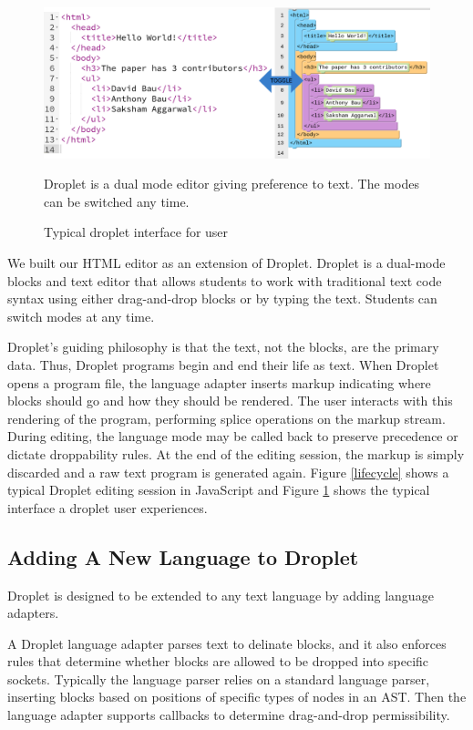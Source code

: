 \documentclass[conference]{IEEEtran}
\begin{document}
\begin{figure}
\centering
\includegraphics[width=6in]{dualmode.png}
\caption{Typical droplet interface for user}
\small
\begin{flushleft}
Droplet is a dual mode editor giving preference to text. The modes can be switched any time.
\end{flushleft}
\label{dropletimage}
\end{figure}

We built our HTML editor as an extension of Droplet.  Droplet \cite{Droplet} is a dual-mode blocks and text editor that allows students to work with traditional text code syntax using either drag-and-drop blocks or by typing the text.  Students can switch modes at any time.

Droplet's guiding philosophy is that the text, not the blocks, are the primary data. Thus, Droplet programs begin and end their life as text. When Droplet opens a program file, the language adapter inserts markup indicating where blocks should go and how they should be rendered. The user interacts with this rendering of the program, performing splice operations on the markup stream. During editing, the language mode may be called back to preserve precedence or dictate droppability rules. At the end of the editing session, the markup is simply discarded and a raw text program is generated again. Figure \ref{lifecycle} shows a typical Droplet editing session in JavaScript and Figure \ref{dropletimage} shows the typical interface a droplet user experiences.

\subsection{Adding A New Language to Droplet}

Droplet is designed to be extended to any text language by adding language adapters.

A Droplet language adapter parses text to delinate blocks, and it also enforces rules that determine whether blocks are allowed to be dropped into specific sockets.  Typically the language parser relies on a standard language parser, inserting blocks based on positions of specific types of nodes in an AST.  Then the language adapter supports callbacks to determine drag-and-drop permissibility.
\end{document}
